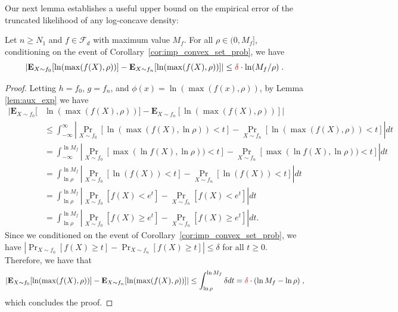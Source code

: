 \documentclass[final,12pt]{colt2018}
\newcommand{\new}[1]{{\color{red} #1}}
\newcommand{\new}[1]{{#1}}
\newtheorem{informal theorem}[theorem]{Theorem (informal statement)}
\newcommand{\E}{\mathbf{E}}
\begin{document}
Our next lemma establishes a useful upper 
bound on the empirical error of the truncated likelihood of any log-concave density:
\begin{lemma}\label{lem:technical_f}
Let $n \geq N_1$ and $f \in \mathcal{F}_d$ with maximum value $M_f$. 
For all $\rho \in (0,M_f]$, \new{conditioning on the event of Corollary~\ref{cor:imp_convex_set_prob},} 
we have \[
|{\E}_{X\sim f_0}[\ln(\max(f(X), \rho))] - {\E}_{X\sim f_n}[\ln(\max(f(X), \rho))]| \leq \new{\delta} \cdot \ln (M_{f}/\rho) \;.
\]
\end{lemma}
\begin{proof}
Letting $h=f_0$, $g=f_n$, and $\phi(x)=\ln(\max(f(x),\rho))$, by Lemma \ref{lem:aux_exp} we have
\begin{align*}
|{\E}_{X\sim f_0}[&\ln(\max(f(X), \rho))] - {\E}_{X\sim f_n}[\ln(\max(f(X), \rho))]| \\
&\leq \int^{\infty}_{-\infty} \left|{\Pr}_{X\sim f_0}[\ln(\max(f(X), \ln \rho)) < t] - {\Pr}_{X\sim f_n}[\ln(\max(f(X), \rho)) < t] \right| dt \\ 
&= \int^{\ln M_f}_{-\infty} \left| {\Pr}_{X\sim f_0}[\max(\ln f(X), \ln \rho)) < t] - {\Pr}_{X\sim f_n}[\max(\ln f(X), {\ln} \rho)) < t] \right| dt \\ 
&= \int^{\ln M_f}_{\ln \rho} \left|{\Pr}_{X\sim f_0}[{\ln( f(X) )} < t] - {\Pr}_{X\sim f_n}[{\ln( f(X)  )} < t] \right| dt \\
&= \int^{\ln M_f}_{\ln \rho} \left|{\Pr}_{X\sim f_0}[f(X) < e^t] - {\Pr}_{X\sim f_n}[f(X) < e^t] \right| dt \\
&= \int^{\ln M_f}_{\ln \rho} \left|{\Pr}_{X\sim f_0}[f(X) \geq e^t] - {\Pr}_{X\sim f_n}[f(X) \geq e^t] \right| dt.
\end{align*}
Since we {conditioned on the event of Corollary~\ref{cor:imp_convex_set_prob}}, 
we have $\left|{\Pr}_{X\sim f_0}[f(X) \geq t] - {\Pr}_{X\sim f_n}[f(X) \geq t]\right| \leq \delta$ for all $t\geq 0$.
Therefore, we have that
$$\left|{\E}_{X\sim f_0}[\ln(\max(f(X), { \rho } ))] - {\E}_{X\sim f_n}[\ln(\max(f(X), \rho))]\right| 
\leq \int^{\ln M_f}_{\ln \rho} {\delta} dt  = \new{\delta} \cdot (\ln M_f - \ln\rho) \;,$$
which concludes the proof.
\end{proof}
\end{document}
